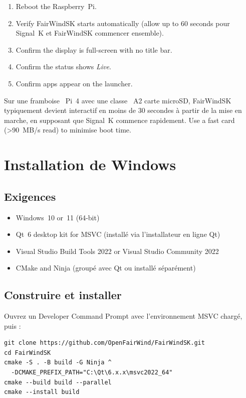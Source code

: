 \begin{enumerate}
  \item Reboot the Raspberry~Pi.
  \item Verify FairWindSK starts automatically (allow up to 60 seconds
pour Signal~K et FairWindSK commencer ensemble).
  \item Confirm the display is full-screen with no title bar.
  \item Confirm the status shows \textit{Live}.
  \item Confirm apps appear on the launcher.
\end{enumerate}

\begin{tipbox}
Sur une framboise ~Pi~4 avec une classe ~A2 carte microSD, FairWindSK
typiquement devient interactif en moins de 30 secondes à partir de la mise en marche,
en supposant que Signal~K commence rapidement.
Use a fast card (\textgreater{}90~MB/s read) to minimise boot time.
\end{tipbox}

\section{Installation de Windows}
\label{app:windows}

\subsection{Exigences}

\begin{itemize}
  \item Windows~10 or~11 (64-bit)
  \item Qt~6 desktop kit for MSVC
(installé via l'installateur en ligne Qt)
  \item Visual Studio Build Tools 2022 or Visual Studio Community 2022
  \item CMake and Ninja
(groupé avec Qt ou installé séparément)
\end{itemize}

\subsection{Construire et installer}

Ouvrez un Developer Command Prompt avec l'environnement MSVC chargé,
puis :

\begin{lstlisting}
git clone https://github.com/OpenFairWind/FairWindSK.git
cd FairWindSK
cmake -S . -B build -G Ninja ^
  -DCMAKE_PREFIX_PATH="C:\Qt\6.x.x\msvc2022_64"
cmake --build build --parallel
cmake --install build
\end{lstlisting}

